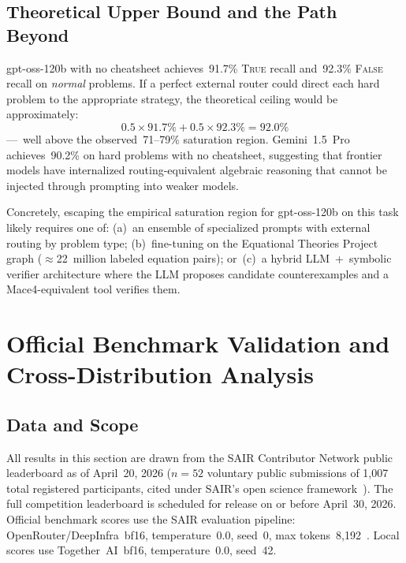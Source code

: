 \documentclass[11pt]{article}
\begin{document}
\subsection{Theoretical Upper Bound and the Path Beyond}

gpt-oss-120b with no cheatsheet achieves~91.7\% \textsc{True} recall
and~92.3\% \textsc{False} recall on \emph{normal} problems. If a
perfect external router could direct each hard problem to the
appropriate strategy, the theoretical ceiling would be approximately:
\[
  0.5 \times 91.7\% + 0.5 \times 92.3\% = 92.0\%
\]
---~well above the observed~71--79\% saturation region. Gemini~1.5~Pro
achieves~90.2\% on hard problems with no cheatsheet, suggesting that
frontier models have internalized routing-equivalent algebraic reasoning
that cannot be injected through prompting into weaker models.

Concretely, escaping the empirical saturation region for gpt-oss-120b
on this task likely requires one of:
(a)~an ensemble of specialized prompts with external routing by problem
type; (b)~fine-tuning on the Equational Theories Project graph
($\approx$22~million labeled equation pairs); or~(c)~a hybrid
LLM~+~symbolic verifier architecture where the LLM proposes candidate
counterexamples and a Mace4-equivalent tool verifies them.

\section{Official Benchmark Validation and Cross-Distribution Analysis}
\label{sec:official}

\subsection{Data and Scope}

All results in this section are drawn from the SAIR Contributor
Network public leaderboard as of April~20, 2026 ($n = 52$ voluntary
public submissions of 1{,}007 total registered participants,
cited under SAIR's open science framework~\citep{sair2026leaderboard}).
The full competition leaderboard is scheduled for release on or
before April~30, 2026. Official benchmark scores use the SAIR
evaluation pipeline: OpenRouter/DeepInfra~bf16, temperature~0.0,
seed~0, max tokens~8{,}192~\citep{sair2026judge}. Local scores
use Together~AI~bf16, temperature~0.0, seed~42.
\end{document}
